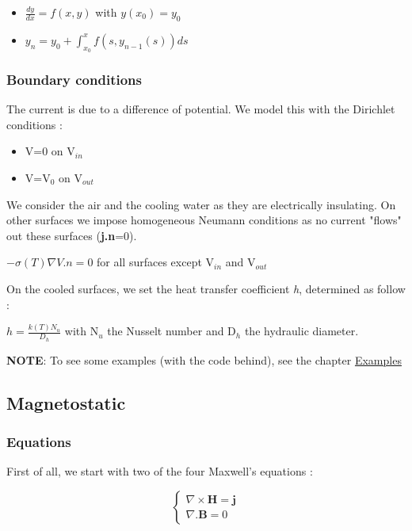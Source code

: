 \documentclass[11pt]{amsart}
\newcommand{\admonition}[2]{\textbf{#1}: {#2}}
\begin{document}
\begin{itemize}

\item $\frac{dy}{dx}=f(x,y)$ with $y(x_{0})=y_{0}$

\item $y_{n}=y_{0}+\int_{x_{0}}^{x}f(s,y_{n-1}(s))ds$

\end{itemize}


\hypertarget{x-boundary-conditions}{\subsubsection{Boundary conditions}}
The current is due to a difference of potential. We model this with the Dirichlet conditions :


\begin{itemize}

\item V=0 on V${}_{in}$

\item V=V${}_{0}$ on V${}_{out}$

\end{itemize}


We consider the air and the cooling water as they are electrically insulating.
On other surfaces we impose homogeneous Neumann conditions as no current "flows" out these surfaces (\textbf{j.n}=0).


$-\sigma(T)\nabla V.n=0$ for all surfaces except V${}_{in}$ and V${}_{out}$


On the cooled surfaces, we set the heat transfer coefficient \emph{h}, determined as follow :


$h=\frac{k(T)N_{u}}{D_{h}}$ with N${}_{u}$ the Nusselt number and D${}_{h}$ the hydraulic diameter.


\admonition{NOTE}{To see some examples (with the code behind), see the chapter \href{/examples}{Examples}}
\hypertarget{x-magnetostatic}{\subsection{Magnetostatic}}
\hypertarget{x-equations}{\subsubsection{Equations}}
First of all, we start with two of the four Maxwell’s equations :



\[
    \left\{ \begin{array}{cc}
      \nabla\times\textbf{H}=\textbf{j}\\
      \nabla.\textbf{B}=0 \end{array} \right.
\]
\end{document}
